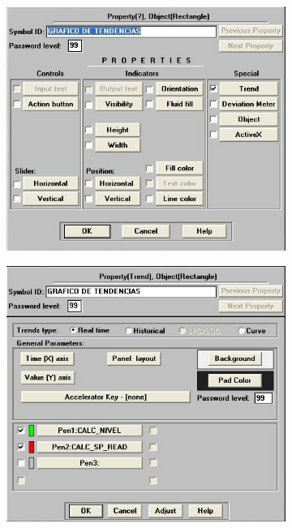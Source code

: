   \begin{figure}[!ht]
	\centering
	\begin{subfigure}[b]{0.2\textwidth}
	   \includegraphics[width=\textwidth]{Cap5-SCADA/images/tendencia.jpeg}
	    \caption{}
	    \label{}
  	\end{subfigure}
	\begin{subfigure}[b]{0.2\textwidth}
	   \includegraphics[width=\textwidth]{Cap5-SCADA/images/tendencia1.jpeg}

\end{subfigure}
\end{figure}
